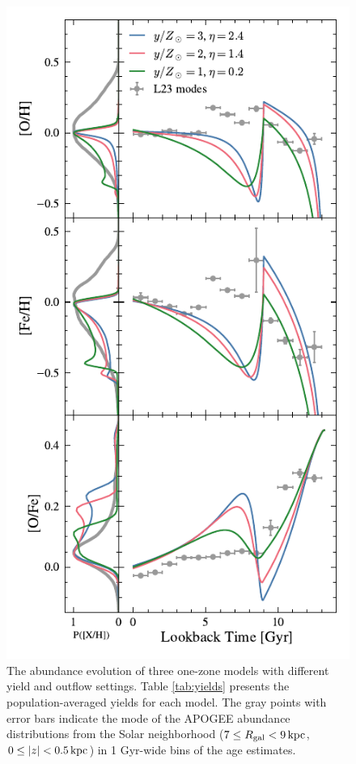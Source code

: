 \documentclass[twocolumn,twocolappendix,linenumbers]{aastex631}
\begin{document}
\begin{figure}
    \centering
    \includegraphics{figures/yield_outflow.pdf}
    \caption{The abundance evolution of three one-zone models with different yield and outflow settings. Table \ref{tab:yields} presents the population-averaged yields for each model. The gray points with error bars indicate the mode of the APOGEE abundance distributions from the Solar neighborhood ($7\leq R_{\rm gal}<9\,{\rm kpc}$, $0\leq|z|<0.5\,{\rm kpc}$) in 1 Gyr-wide bins of the \citet{leung_variational_2023} age estimates.}
    \label{fig:yield-outflow}
\end{figure}
\end{document}
